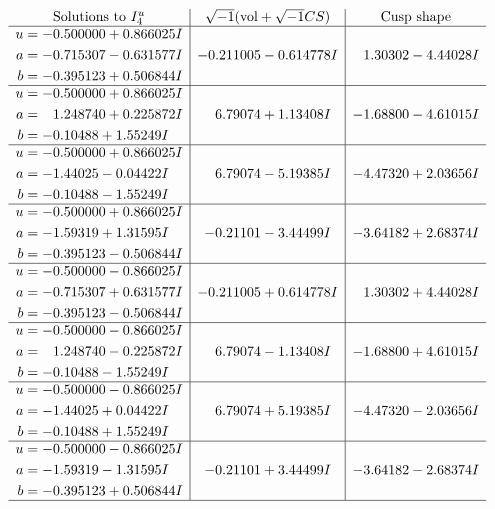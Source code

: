 \documentclass[1p]{elsarticle_modified}
\theoremstyle{definition}
\newcommand{\I}{\sqrt{-1}}
\begin{document}
$$\begin{array}{c|c|c}  
\text{Solutions to }I^u_{4}& \I (\text{vol} + \sqrt{-1}CS) & \text{Cusp shape}\\
 \hline 
\begin{aligned}
u &= -0.500000 + 0.866025 I \\
a &= -0.715307 - 0.631577 I \\
b &= -0.395123 + 0.506844 I\end{aligned}
 & -0.211005 - 0.614778 I & \phantom{-}1.30302 - 4.44028 I \\ \hline\begin{aligned}
u &= -0.500000 + 0.866025 I \\
a &= \phantom{-}1.248740 + 0.225872 I \\
b &= -0.10488 + 1.55249 I\end{aligned}
 & \phantom{-}6.79074 + 1.13408 I & -1.68800 - 4.61015 I \\ \hline\begin{aligned}
u &= -0.500000 + 0.866025 I \\
a &= -1.44025 - 0.04422 I \\
b &= -0.10488 - 1.55249 I\end{aligned}
 & \phantom{-}6.79074 - 5.19385 I & -4.47320 + 2.03656 I \\ \hline\begin{aligned}
u &= -0.500000 + 0.866025 I \\
a &= -1.59319 + 1.31595 I \\
b &= -0.395123 - 0.506844 I\end{aligned}
 & -0.21101 - 3.44499 I & -3.64182 + 2.68374 I \\ \hline\begin{aligned}
u &= -0.500000 - 0.866025 I \\
a &= -0.715307 + 0.631577 I \\
b &= -0.395123 - 0.506844 I\end{aligned}
 & -0.211005 + 0.614778 I & \phantom{-}1.30302 + 4.44028 I \\ \hline\begin{aligned}
u &= -0.500000 - 0.866025 I \\
a &= \phantom{-}1.248740 - 0.225872 I \\
b &= -0.10488 - 1.55249 I\end{aligned}
 & \phantom{-}6.79074 - 1.13408 I & -1.68800 + 4.61015 I \\ \hline\begin{aligned}
u &= -0.500000 - 0.866025 I \\
a &= -1.44025 + 0.04422 I \\
b &= -0.10488 + 1.55249 I\end{aligned}
 & \phantom{-}6.79074 + 5.19385 I & -4.47320 - 2.03656 I \\ \hline\begin{aligned}
u &= -0.500000 - 0.866025 I \\
a &= -1.59319 - 1.31595 I \\
b &= -0.395123 + 0.506844 I\end{aligned}
 & -0.21101 + 3.44499 I & -3.64182 - 2.68374 I\\
 \hline 
 \end{array}$$\newpage
\end{document}
